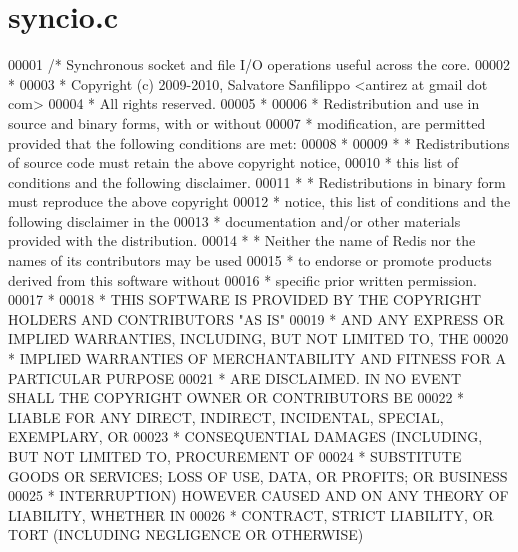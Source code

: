 \hypertarget{syncio_8c_source}{}\section{syncio.\+c}
\label{syncio_8c_source}

\begin{DoxyCode}
00001 \textcolor{comment}{/* Synchronous socket and file I/O operations useful across the core.}
00002 \textcolor{comment}{ *}
00003 \textcolor{comment}{ * Copyright (c) 2009-2010, Salvatore Sanfilippo <antirez at gmail dot com>}
00004 \textcolor{comment}{ * All rights reserved.}
00005 \textcolor{comment}{ *}
00006 \textcolor{comment}{ * Redistribution and use in source and binary forms, with or without}
00007 \textcolor{comment}{ * modification, are permitted provided that the following conditions are met:}
00008 \textcolor{comment}{ *}
00009 \textcolor{comment}{ *   * Redistributions of source code must retain the above copyright notice,}
00010 \textcolor{comment}{ *     this list of conditions and the following disclaimer.}
00011 \textcolor{comment}{ *   * Redistributions in binary form must reproduce the above copyright}
00012 \textcolor{comment}{ *     notice, this list of conditions and the following disclaimer in the}
00013 \textcolor{comment}{ *     documentation and/or other materials provided with the distribution.}
00014 \textcolor{comment}{ *   * Neither the name of Redis nor the names of its contributors may be used}
00015 \textcolor{comment}{ *     to endorse or promote products derived from this software without}
00016 \textcolor{comment}{ *     specific prior written permission.}
00017 \textcolor{comment}{ *}
00018 \textcolor{comment}{ * THIS SOFTWARE IS PROVIDED BY THE COPYRIGHT HOLDERS AND CONTRIBUTORS "AS IS"}
00019 \textcolor{comment}{ * AND ANY EXPRESS OR IMPLIED WARRANTIES, INCLUDING, BUT NOT LIMITED TO, THE}
00020 \textcolor{comment}{ * IMPLIED WARRANTIES OF MERCHANTABILITY AND FITNESS FOR A PARTICULAR PURPOSE}
00021 \textcolor{comment}{ * ARE DISCLAIMED. IN NO EVENT SHALL THE COPYRIGHT OWNER OR CONTRIBUTORS BE}
00022 \textcolor{comment}{ * LIABLE FOR ANY DIRECT, INDIRECT, INCIDENTAL, SPECIAL, EXEMPLARY, OR}
00023 \textcolor{comment}{ * CONSEQUENTIAL DAMAGES (INCLUDING, BUT NOT LIMITED TO, PROCUREMENT OF}
00024 \textcolor{comment}{ * SUBSTITUTE GOODS OR SERVICES; LOSS OF USE, DATA, OR PROFITS; OR BUSINESS}
00025 \textcolor{comment}{ * INTERRUPTION) HOWEVER CAUSED AND ON ANY THEORY OF LIABILITY, WHETHER IN}
00026 \textcolor{comment}{ * CONTRACT, STRICT LIABILITY, OR TORT (INCLUDING NEGLIGENCE OR OTHERWISE)}

\end{DoxyCode}
